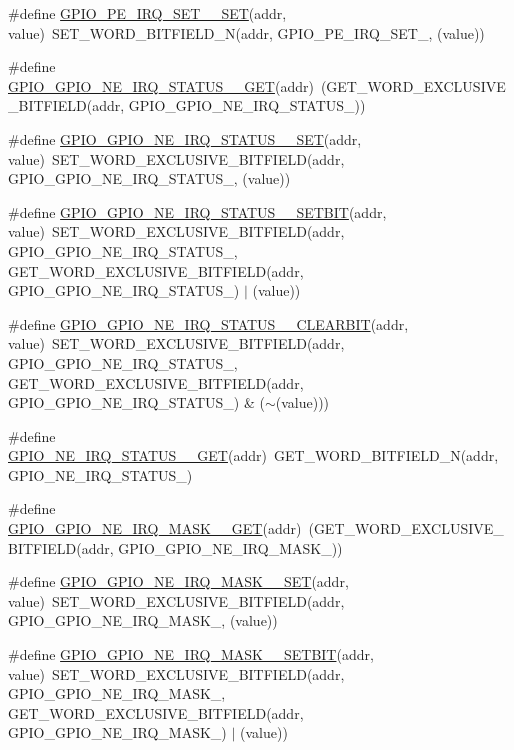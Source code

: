 \begin{DoxyCompactItemize}
\item 
\#define \hyperlink{a00554_ad076de161adcd8bec4606a2a7cd9b425}{GPIO\_\-PE\_\-IRQ\_\-SET\_\_\-SET}(addr, value)~SET\_\-WORD\_\-BITFIELD\_\-N(addr, GPIO\_\-PE\_\-IRQ\_\-SET\_, (value))
\item 
\#define \hyperlink{a00554_a78301234abea16f03394b5703833a422}{GPIO\_\-GPIO\_\-NE\_\-IRQ\_\-STATUS\_\_\-GET}(addr)~(GET\_\-WORD\_\-EXCLUSIVE\_\-BITFIELD(addr, GPIO\_\-GPIO\_\-NE\_\-IRQ\_\-STATUS\_))
\item 
\#define \hyperlink{a00554_a0092acfb0dd1a4d8ab1650b4b8270014}{GPIO\_\-GPIO\_\-NE\_\-IRQ\_\-STATUS\_\_\-SET}(addr, value)~SET\_\-WORD\_\-EXCLUSIVE\_\-BITFIELD(addr, GPIO\_\-GPIO\_\-NE\_\-IRQ\_\-STATUS\_, (value))
\item 
\#define \hyperlink{a00554_a87a4aca2b5a20e6ccb5240957a08d5b1}{GPIO\_\-GPIO\_\-NE\_\-IRQ\_\-STATUS\_\_\-SETBIT}(addr, value)~SET\_\-WORD\_\-EXCLUSIVE\_\-BITFIELD(addr, GPIO\_\-GPIO\_\-NE\_\-IRQ\_\-STATUS\_, GET\_\-WORD\_\-EXCLUSIVE\_\-BITFIELD(addr, GPIO\_\-GPIO\_\-NE\_\-IRQ\_\-STATUS\_) $|$ (value))
\item 
\#define \hyperlink{a00554_a1ef04059b5ab3aed6d825a125b2c7684}{GPIO\_\-GPIO\_\-NE\_\-IRQ\_\-STATUS\_\_\-CLEARBIT}(addr, value)~SET\_\-WORD\_\-EXCLUSIVE\_\-BITFIELD(addr, GPIO\_\-GPIO\_\-NE\_\-IRQ\_\-STATUS\_, GET\_\-WORD\_\-EXCLUSIVE\_\-BITFIELD(addr, GPIO\_\-GPIO\_\-NE\_\-IRQ\_\-STATUS\_) \& ($\sim$(value)))
\item 
\#define \hyperlink{a00554_a9be16a83da5cc24b3dfe2db6c094b77b}{GPIO\_\-NE\_\-IRQ\_\-STATUS\_\_\-GET}(addr)~GET\_\-WORD\_\-BITFIELD\_\-N(addr, GPIO\_\-NE\_\-IRQ\_\-STATUS\_)
\item 
\#define \hyperlink{a00554_abcd16c68ef762f493a77bc93250d0e23}{GPIO\_\-GPIO\_\-NE\_\-IRQ\_\-MASK\_\_\-GET}(addr)~(GET\_\-WORD\_\-EXCLUSIVE\_\-BITFIELD(addr, GPIO\_\-GPIO\_\-NE\_\-IRQ\_\-MASK\_))
\item 
\#define \hyperlink{a00554_a572bd5d7f623dcecd3b856aa1d3fa43a}{GPIO\_\-GPIO\_\-NE\_\-IRQ\_\-MASK\_\_\-SET}(addr, value)~SET\_\-WORD\_\-EXCLUSIVE\_\-BITFIELD(addr, GPIO\_\-GPIO\_\-NE\_\-IRQ\_\-MASK\_, (value))
\item 
\#define \hyperlink{a00554_a79ac071970a8e6566acf3c5dcb3543f8}{GPIO\_\-GPIO\_\-NE\_\-IRQ\_\-MASK\_\_\-SETBIT}(addr, value)~SET\_\-WORD\_\-EXCLUSIVE\_\-BITFIELD(addr, GPIO\_\-GPIO\_\-NE\_\-IRQ\_\-MASK\_, GET\_\-WORD\_\-EXCLUSIVE\_\-BITFIELD(addr, GPIO\_\-GPIO\_\-NE\_\-IRQ\_\-MASK\_) $|$ (value))
\item 

\end{DoxyCompactItemize}
